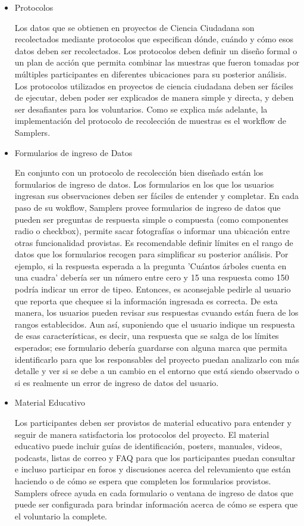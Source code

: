 \begin{itemize}
	\item {Protocolos}	
			
			Los datos que se obtienen en proyectos de Ciencia Ciudadana son recolectados mediante protocolos que especifican dónde, cuándo y cómo esos datos deben ser recolectados. Los protocolos deben definir un diseño formal o un plan de acción que permita combinar las muestras que fueron tomadas por múltiples participantes en diferentes ubicaciones para su posterior análisis. Los protocolos utilizados en proyectos de ciencia ciudadana deben ser fáciles de ejecutar, deben poder ser explicados de manera simple y directa, y deben ser desafiantes para los voluntarios.\cite{bonney2009citizen}
		Como se explica más adelante, la implementación del protocolo de recolección de muestras es el workflow de Samplers.
		
	\item {Formularios de ingreso de Datos}	
			
			En conjunto con un protocolo de recolección bien diseñado están los formularios de ingreso de datos. Los formularios en los que los usuarios ingresan sus observaciones deben ser fáciles de entender y completar. En cada paso de su wokflow, Samplers provee formularios de ingreso de datos que pueden ser preguntas de respuesta simple o compuesta (como componentes radio o checkbox), permite sacar fotografías o informar una ubicación entre otras funcionalidad provistas. 
			Es recomendable definir límites en el rango de datos que los formularios recogen para simplificar su posterior análisis. Por ejemplo, si la respuesta esperada a la pregunta 'Cuántos árboles cuenta en una cuadra' debería ser un número entre cero y 15 una respuesta como 150 podría indicar un error de tipeo. Entonces, es aconsejable pedirle al usuario que reporta que chequee si la información ingresada es correcta. De esta manera, los usuarios pueden revisar sus respuestas cvuando están fuera de los rangos establecidos. Aun así, suponiendo que el usuario indique un respuesta de esas características, es decir, una respuesta que se salga de los límites esperados; ese formulario debería guardarse con alguna marca que permita identificarlo para que los responsables del proyecto puedan analizarlo con más detalle y ver si se debe a un cambio en el entorno que está siendo observado o si es realmente un error de ingreso de datos del usuario.
			
	\item {Material Educativo}
		
		Los participantes deben ser provistos de material educativo para entender y seguir de manera satisfactoria los protocolos del proyecto. El material educativo puede incluir guías de identificación, posters, manuales, videos, podcasts, listas de correo y FAQ para que los participantes puedan consultar e incluso participar en foros y discusiones acerca del relevamiento que están haciendo o de cómo se espera que completen los formularios provistos. 
		Samplers ofrece ayuda en cada formulario o ventana de ingreso de datos que puede ser configurada para brindar información acerca de cómo se espera que el voluntario la complete.
		
\end{itemize} 


